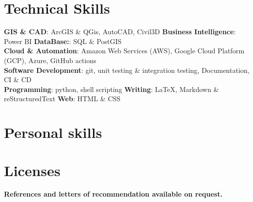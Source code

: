 \documentclass[letterpaper,11pt]{article}
\begin{document}
\section{Technical Skills}
\begin{itemize}[leftmargin=0.15in, label={}]
  \small{\item{
                \textbf{GIS \& CAD}{: ArcGIS \& QGis, AutoCAD, Civil3D} \textbf{Business Intelligence}{: Power BI}  \textbf{DataBase:}{: SQL \& PostGIS}\\
                \textbf{Cloud \& Automation}{: Amazon Web Services (AWS), Google Cloud Platform (GCP), Azure, GitHub actions}\\
                \textbf{Software Development}{: git, unit testing \& integration testing, Documentation, CI \& CD}\\
                \textbf{Programming}{: python, shell scripting}         \textbf{Writing}{: \LaTeX\:, Markdown \& reStructuredText}       \textbf{Web}{: HTML \& CSS}\\
          }}
\end{itemize}


\section{Personal skills}
\skillsItemsListStart
\skillsItemsListEnd

\section{Licenses}
\skillsItemsListStart
\skillsItemsListEnd

\centering
\textbf{References and letters of recommendation available on request.}

\end{document}
